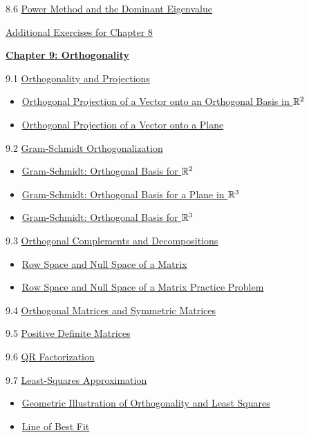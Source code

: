 \documentclass{ximera}
\begin{document}
8.6	\href{\xmbaseurl/EIG-0070/main}{Power Method and the Dominant Eigenvalue}
	
\href{\xmbaseurl/SUPX-0080/main}{Additional Exercises for Chapter 8}
	
\href{\xmbaseurl/XLAChapter_orthogonality/main}{\textbf{Chapter 9: Orthogonality}}
	
9.1	\href{\xmbaseurl/RTH-0010/main}{Orthogonality and Projections}
\begin{itemize}
    \item 
    \href{https://www.geogebra.org/m/nsqzhsxv}{Orthogonal Projection of a Vector onto an Orthogonal Basis in $\mathbb{R}^2$}
   \item
   \href{https://www.geogebra.org/m/hehqyayz}{Orthogonal Projection of a Vector onto a Plane}
\end{itemize}
	
9.2	\href{\xmbaseurl/RTH-0015/main}{Gram-Schmidt Orthogonalization}
\begin{itemize}
    \item 
    \href{https://www.geogebra.org/m/xtqppyav}{Gram-Schmidt: Orthogonal Basis for $\mathbb{R}^2$}
    \item
    \href{https://www.geogebra.org/m/zghsfkym}{Gram-Schmidt: Orthogonal Basis for a Plane in $\mathbb{R}^3$}
    \item
    \href{https://www.geogebra.org/m/qjpvmsws}{Gram-Schmidt:  Orthogonal Basis for $\mathbb{R}^3$}
\end{itemize}
	
9.3	\href{\xmbaseurl/RTH-0020/main}{Orthogonal Complements and Decompositions}
\begin{itemize}
    \item 
    \href{https://www.geogebra.org/m/f6eavqxs}{Row Space and Null Space of a Matrix}
    \item
    \href{https://www.geogebra.org/m/tyntjmdp}{Row Space and Null Space of a Matrix Practice Problem}
\end{itemize}
	
9.4	\href{\xmbaseurl/RTH-0035/main}{Orthogonal Matrices and Symmetric Matrices}
	
9.5	\href{\xmbaseurl/RTH-0045/main}{Positive Definite Matrices}
	
9.6	\href{\xmbaseurl/RTH-0040/main}{QR Factorization}
	
9.7	\href{\xmbaseurl/RTH-0030/main}{Least-Squares Approximation}
\begin{itemize}
    \item 
    \href{https://www.geogebra.org/classic/mm7wauhw}{Geometric Illustration of Orthogonality and Least Squares}
    \item 
    \href{https://www.geogebra.org/classic/crgw4usb}{Line of Best Fit}
\end{itemize}
	
\end{document}
